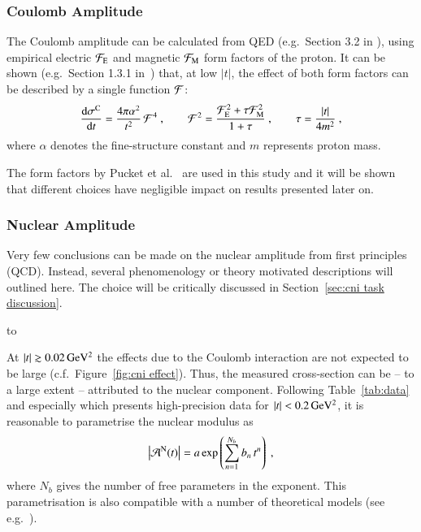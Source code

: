 \subsubsection{Coulomb Amplitude}
\label{sec:cni coulomb}
%
The Coulomb amplitude can be calculated from QED (e.g.~Section 3.2 in \cite{block06}), using empirical electric ${\cal F}_{\rm E}$ and magnetic ${\cal F}_{\rm M}$ form factors of the proton. It can be shown (e.g.~Section 1.3.1 in~\cite{jan_thesis}) that, at low $|t|$, the effect of both form factors can be described by a single function ${\cal F}$:
\begin{equation}
\label{eq:coul cs}
	{\d\sigma^{\rm C}\over \d t} = {4\pi\alpha^2\over t^2}\,{\cal F}^4\ ,\qquad 
	{\cal F}^2 = {{\cal F}_{\rm E}^2 + \tau {\cal F}_{\rm M}^2\over 1 + \tau}\ ,\qquad 
	\tau = {|t|\over 4m^2}\ ,
\end{equation}
where $\alpha$ denotes the fine-structure constant and $m$ represents proton mass.

The form factors by Pucket et al.~\cite{puckett10} are used in this study and it will be shown that different choices have negligible impact on results presented later on.


\subsubsection{Nuclear Amplitude}
\label{sec:cni nuclear}

Very few conclusions can be made on the nuclear amplitude from first principles (QCD). Instead, several phenomenology or theory motivated descriptions will outlined here. The choice will be critically discussed in Section~\ref{sec:cni task discussion}.

\vskip3mm
\hbox to

At $|t| \gtrsim 0.02\,{\rm GeV^2}$ the effects due to the Coulomb interaction are not expected to be large (c.f.~Figure~\ref{fig:cni effect}). Thus, the measured cross-section can be -- to a large extent -- attributed to the nuclear component. Following Table~\ref{tab:data} and especially \cite{8tev-90m} which presents high-precision data for $|t| < 0.2\,{\rm GeV^2}$, it is reasonable to parametrise the nuclear modulus as
\begin{equation}
\label{eq:nuc mod}
\left | {\cal A}^{\rm N}(t) \right | = a \exp\left( \sum\limits_{n = 1}^{N_b} b_n\, t^n \right)\ ,
\end{equation}
where $N_b$ gives the number of free parameters in the exponent. This parametrisation is also compatible with a number of theoretical models (see e.g.~\cite{elegent}).

